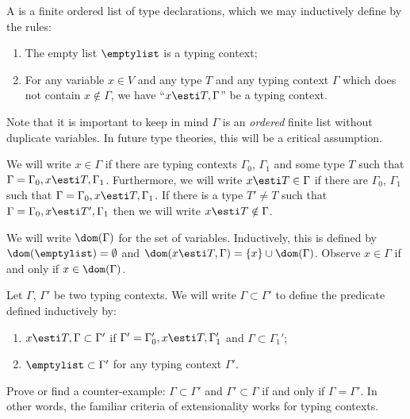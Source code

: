 \begin{node}[Syntax]
\begin{definition}\label{stlc-0009}%
A  is a finite ordered list of type declarations,
which we may inductively define by the rules:
\begin{enumerate}
\item The empty list $\emptylist$ is a typing context;
\item For any variable $x\in V$ and any type $T$ and any typing context
  $\Gamma$ which does not contain $x\notin\Gamma$,
  we have ``$x\esti T,\Gamma$'' be a typing context.
\end{enumerate}
Note that it is important to keep in mind $\Gamma$ is an \emph{ordered}
finite list without duplicate variables. In future type theories, this
will be a critical assumption.

\begin{node}\label{stlc-000K}%
We will write $x\in\Gamma$ if there are typing contexts $\Gamma_{0}$,
$\Gamma_{1}$ and some type $T$ such that $\Gamma=\Gamma_{0},x\esti T,\Gamma_{1}$.
Furthermore, we will write $x\esti T\in\Gamma$ if there are $\Gamma_{0}$,
$\Gamma_{1}$ such that $\Gamma=\Gamma_{0},x\esti T,\Gamma_{1}$.
If there is a type $T'\neq T$ such that $\Gamma=\Gamma_{0},x\esti T',\Gamma_{1}$
then we will write $x\esti T\notin\Gamma$.
\end{node}

\begin{node}\label{stlc-000E}%
We will write $\dom(\Gamma)$ for the set of variables. Inductively, this
is defined by $\dom(\emptylist)=\emptyset$ and $\dom(x\esti T,\Gamma)=\{x\}\cup\dom(\Gamma)$.
Observe $x\in\Gamma$ if and only if $x\in\dom(\Gamma)$.
\end{node}

\begin{node}\label{stlc-000F}%
Let $\Gamma$, $\Gamma'$ be two typing contexts. We will write
$\Gamma\subset\Gamma'$ to define the predicate defined inductively by:
\begin{enumerate}
\item $x\esti T,\Gamma\subset \Gamma'$ if $\Gamma'=\Gamma_{0}',x\esti T,\Gamma_{1}'$
  and $\Gamma\subset\Gamma_{1}'$;
\item $\emptylist\subset\Gamma'$ for any typing context $\Gamma'$.
\end{enumerate}
\end{node}

\begin{node}[Exercise]\label{stlc-000G}%
Prove or find a counter-example: $\Gamma\subset\Gamma'$ and
$\Gamma'\subset\Gamma$ if and only if $\Gamma=\Gamma'$. In other words,
the familiar criteria of extensionality works for typing contexts.
\end{node}
\end{definition}


\end{node}
